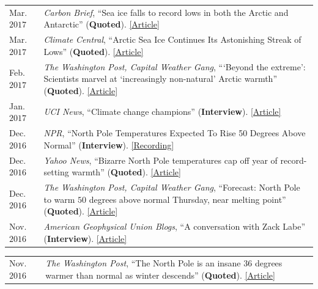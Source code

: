 \documentclass[margin,line,palatino,courier,10pt]{res}
\begin{document}
\begin{resume}
\begin{tabular}{@{}p{0.8in}p{4in}}
Mar. $2017$ & \textit{Carbon Brief}, ``Sea ice falls to record lows in both the Arctic and Antarctic'' (\textbf{Quoted}). \href{https://www.carbonbrief.org/sea-ice-falls-record-lows-arctic-antarctic}{[Article]}\\
Mar. $2017$ & \textit{Climate Central}, ``Arctic Sea Ice Continues Its Astonishing Streak of Lows'' (\textbf{Quoted}). \href{http://www.climatecentral.org/news/arctic-sea-ice-record-low-streak-21227}{[Article]}\\
Feb. $2017$ & \textit{The Washington Post, Capital Weather Gang}, ```Beyond the extreme': Scientists marvel at `increasingly non-natural' Arctic warmth'' (\textbf{Quoted}). \href{https://www.washingtonpost.com/news/capital-weather-gang/wp/2017/02/01/beyond-the-extreme-scientists-marvel-at-increasingly-non-natural-arctic-warmth/?sdfsdfsdfsdfsd&utm_term=.cf3cf81d24f3}{[Article]}\\
Jan. $2017$ & \textit{UCI News}, ``Climate change champions'' (\textbf{Interview}). \href{https://news.uci.edu/climate-change-champions/}{[Article]}\\
Dec. $2016$ & \textit{NPR}, ``North Pole Temperatures Expected To Rise 50 Degrees Above Normal'' (\textbf{Interview}). \href{http://www.npr.org/2016/12/21/506483966/north-pole-temperatures-expected-to-rise-50-degrees-above-normal}{[Recording]}\\
Dec. $2016$ & \textit{Yahoo News}, ``Bizarre North Pole temperatures cap off year of record-setting warmth'' (\textbf{Quoted}). \href{https://www.yahoo.com/news/bizarre-north-pole-temperatures-cap-off-year-of-record-setting-warmth-181727978.html?soc_src=social-sh&soc_trk=tw}{[Article]}\\
Dec. $2016$ & \textit{The Washington Post, Capital Weather Gang}, ``Forecast: North Pole to warm $50$ degrees above normal Thursday, near melting point'' (\textbf{Quoted}). \href{https://www.washingtonpost.com/news/capital-weather-gang/wp/2016/12/20/forecast-north-pole-to-warm-50-degrees-above-normal-thursday-near-melting-point/?dfgdfgdfgdfg&utm_term=.e648369ada7e}{[Article]}\\
Nov. $2016$ & \textit{American Geophysical Union Blogs}, ``A conversation with Zack Labe'' (\textbf{Interview}). \href{http://blogs.agu.org/mountainbeltway/2016/11/23/conversation-zack-labe/}{[Article]}\\
\end{tabular}
\begin{tabular}{@{}p{0.8in}p{4in}}
Nov. $2016$ & \textit{The Washington Post}, ``The North Pole is an insane 36 degrees warmer than normal as winter descends'' (\textbf{Quoted}). \href{https://www.washingtonpost.com/news/energy-environment/wp/2016/11/17/the-north-pole-is-an-insane-36-degrees-warmer-than-normal-as-winter-descends/?utm_term=.f2cb9596b3d8}{[Article]}\\

\end{tabular}
\end{resume}
\end{document}
